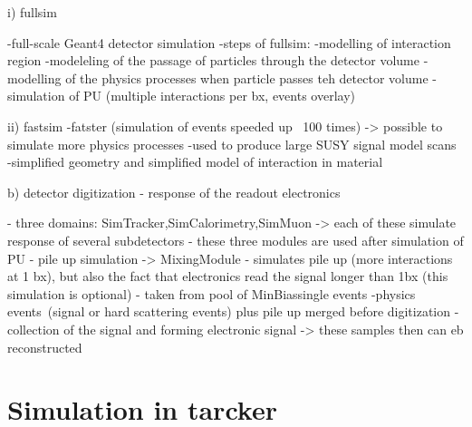 i) fullsim 

-full-scale Geant4 detector simulation
-steps of fullsim:
	-modelling of interaction region
	-modeleling of the passage of particles through the detector volume
	-modelling of the physics processes when particle passes teh detector volume
	-simulation of PU (multiple interactions per bx, events overlay)

ii) fastsim
-fatster (simulation of events speeded up ~100 times)
-> possible to simulate more physics processes
-used to produce large SUSY signal model scans
-simplified geometry and simplified model of interaction in material

b) detector digitization - response of the readout electronics


- three domains: SimTracker,SimCalorimetry,SimMuon -> each of these simulate response of several subdetectors
- these three modules are used after simulation of PU
- pile up simulation -> MixingModule - simulates pile up (more interactions at 1 bx), but also the fact that electronics read the signal longer than 1bx (this simulation is optional) - taken from pool of MinBiassingle events
-physics events~(signal or hard scattering events) plus pile up merged before digitization  
- collection of the signal and forming electronic signal
-> these samples then can eb reconstructed



\section{Simulation in tarcker}



